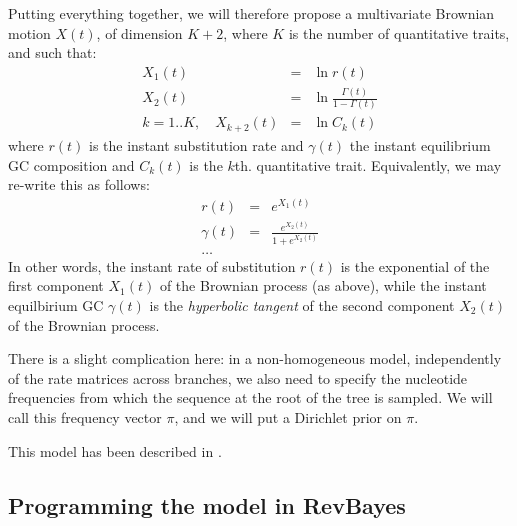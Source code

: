 Putting everything together, we will therefore propose a multivariate Brownian motion $X(t)$, of dimension $K+2$, where $K$ is the number of quantitative traits, and such that:
\begin{eqnarray*}
X_1(t) &=& \ln r(t)
\\
X_2(t) &=& \ln \frac{\Gamma(t)}{1 - \Gamma(t)}
\\
k=1..K, \quad X_{k+2}(t) &=& \ln C_k(t)
\end{eqnarray*}
where $r(t)$ is the instant substitution rate and $\gamma(t)$ the instant equilibrium GC composition
and $C_k(t)$ is the $k$th. quantitative trait.
Equivalently, we may re-write this as follows:
\begin{eqnarray*}
r(t) &=& e^{X_1(t)}
\\
\gamma(t) &=& \frac{e^{X_2(t)}}{1 + e^{X_2(t)}}
\\
\ldots
\end{eqnarray*}
In other words, the instant rate of substitution $r(t)$ is the exponential of the first component $X_1(t)$ of the Brownian process (as above), while the instant equilbirium GC $\gamma(t)$ is the \emph{hyperbolic tangent} of the second component $X_2(t)$ of the Brownian process.

There is a slight complication here: in a non-homogeneous model, independently of the rate matrices across branches, we also need to specify the nucleotide frequencies from which the sequence at the root of the tree is sampled. We will call this frequency vector $\pi$, and we will put a Dirichlet prior on $\pi$.

This model has been described in \cite{Lartillot:OUn7WLs9}.

\subsection*{Programming the model in RevBayes}

